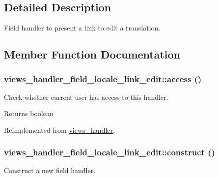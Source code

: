 \subsection{Detailed Description}
Field handler to present a link to edit a translation. 

\subsection{Member Function Documentation}
\hypertarget{classviews__handler__field__locale__link__edit_aef9bc33a9c15cd4a9b6958445762a703}{
\subsubsection[{access}]{\setlength{\rightskip}{0pt plus 5cm}views\_\-handler\_\-field\_\-locale\_\-link\_\-edit::access ()}}
\label{classviews__handler__field__locale__link__edit_aef9bc33a9c15cd4a9b6958445762a703}
Check whether current user has access to this handler.

\begin{DoxyReturn}{Returns}
boolean 
\end{DoxyReturn}


Reimplemented from \hyperlink{classviews__handler_a3f2fbfe1e0849d06ae77149412b821f6}{views\_\-handler}.\hypertarget{classviews__handler__field__locale__link__edit_a6f7db94c0dc07564c1853fd7ef153a6e}{
\subsubsection[{construct}]{\setlength{\rightskip}{0pt plus 5cm}views\_\-handler\_\-field\_\-locale\_\-link\_\-edit::construct ()}}
\label{classviews__handler__field__locale__link__edit_a6f7db94c0dc07564c1853fd7ef153a6e}
Construct a new field handler. 

